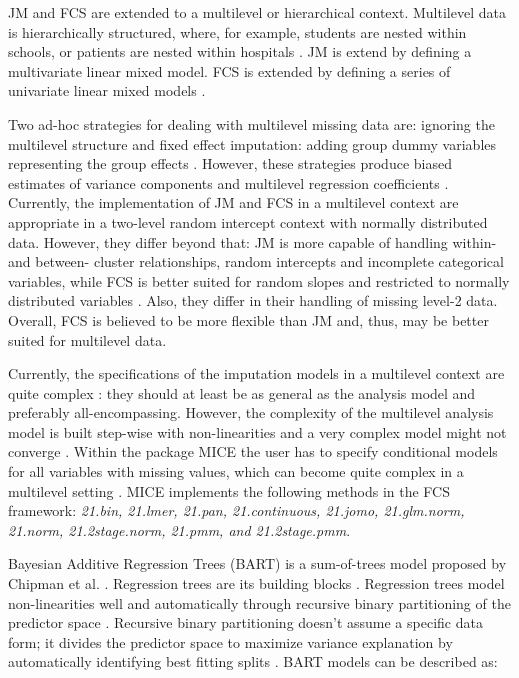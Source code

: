 \documentclass[10pt, a4paper, titlepage]{article}
\begin{document}
JM and FCS are extended to a multilevel or hierarchical context. Multilevel data is hierarchically structured, where, for example, students are nested within schools, or patients are nested within hospitals \citep{hox2017}. JM is extend by defining a multivariate linear mixed model. FCS is extended by defining a series of univariate linear mixed models \citep{mistlerComparisonJointModel2017}.

Two ad-hoc strategies for dealing with multilevel missing data are: ignoring the multilevel structure and fixed effect imputation: adding group dummy variables representing the group effects \citep{ludtke2017, enders2016}. However, these strategies produce biased estimates of variance components and multilevel regression coefficients \citep{ludtke2017}. Currently, the implementation of JM and FCS in a multilevel context are appropriate in a two-level random intercept context with normally distributed data. However, they differ beyond that: JM is more capable of handling within- and between- cluster relationships, random intercepts and incomplete categorical variables, while FCS is better suited for random slopes and restricted to normally distributed variables \citep{enders2016}. Also, they differ in their handling of missing level-2 data. Overall, FCS is believed to be more flexible than JM \citep{audigier2018} and, thus, may be better suited for multilevel data.

Currently, the specifications of the imputation models in a multilevel context are quite complex \citep{buurenFlexibleImputationMissing2018}: they should at least be as general as the analysis model \citep{grund2018} and preferably all-encompassing. However, the complexity of the multilevel analysis model is built step-wise with non-linearities \citep{hox2017} and a very complex model might not converge \citep{buurenFlexibleImputationMissing2018}. Within the package MICE \citep{buuren2011} the user has to specify conditional models for all variables with missing values, which can become quite complex in a multilevel setting \citep{buurenFlexibleImputationMissing2018, burgette2010}. MICE implements the following methods in the FCS framework: \textit{21.bin, 21.lmer, 21.pan, 21.continuous, 21.jomo, 21.glm.norm, 21.norm, 21.2stage.norm, 21.pmm, and 21.2stage.pmm}.

Bayesian Additive Regression Trees (BART) is a sum-of-trees model proposed by Chipman et al. \citep{chipman2010}. Regression trees are its building blocks \citep{chipman2010, hill2020, james2021}. Regression trees model non-linearities well and automatically through recursive binary partitioning of the predictor space \citep{hill2020, burgette2010}. Recursive binary partitioning doesn't assume a specific data form; it divides the predictor space to maximize variance explanation by automatically identifying best fitting splits \citep{hastie2017, james2021, salditt2023}. BART models can be described as:
\end{document}
